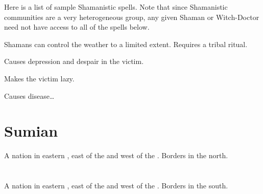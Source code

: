 Here is a list of sample Shamanistic spells. Note that since Shamanistic communities are a very heterogeneous group, any given Shaman or Witch-Doctor need not have access to all of the spells below. 

Shamans can control the weather to a limited extent. Requires a tribal ritual. 

Causes depression and despair in the victim. 

Makes the victim lazy. 

Causes disease\ldots{} 















\section{Sumian}
A nation in eastern , east of the  and west of the . 
Borders  in the north. 















\section[Thyrin]{\Thyrin}
\index{\Thyrin}
A nation in eastern , east of the  and west of the . 
Borders  in the south. 















\section{\UltimaThule}
\index{\UltimaThule}

